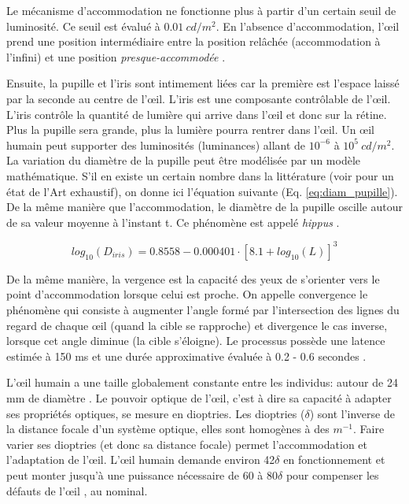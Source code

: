 	\par Le mécanisme d'accommodation ne fonctionne plus à partir d'un certain seuil de luminosité. Ce seuil est évalué à $0.01~cd/m^2$. En l'absence d'accommodation, l'œil prend une position intermédiaire entre la position relâchée (accommodation à l'infini) et une position \textit{presque-accommodée} \citep{gross_human_2008}.
	
	\par Ensuite, la pupille et l'iris sont intimement liées car la première est l'espace laissé par la seconde au centre de l'œil. L'iris est une composante contrôlable de l'œil. L'iris contrôle la quantité de lumière qui arrive dans l'œil et donc sur la rétine. Plus la pupille sera grande, plus la lumière pourra rentrer dans l'œil. Un œil humain peut supporter des luminosités (luminances) allant de $10^{-6}$ à $10^5~cd/m^2$. La variation du diamètre de la pupille peut être modélisée par un modèle mathématique. S'il en existe un certain nombre dans la littérature (voir \citep{watson_unified_2012} pour un état de l'Art exhaustif), on donne ici l'équation suivante (Eq. \ref{eq:diam_pupille}). De la même manière que l'accommodation, le diamètre de la pupille oscille autour de sa valeur moyenne à l'instant t. Ce phénomène est appelé \textit{hippus} \citep{gross_human_2008}.
	
	\begin{equation}
		log_{10}(D_{iris}) = 0.8558 - 0.000401 \cdot [8.1 + log_{10}(L)]^3
		\label{eq:diam_pupille}
	\end{equation}
	
	\par De la même manière, la vergence est la capacité des yeux de s'orienter vers le point d'accommodation lorsque celui est proche. On appelle convergence le phénomène qui consiste à augmenter l'angle formé par l'intersection des lignes du regard de chaque œil (quand la cible se rapproche) et divergence le cas inverse, lorsque cet angle diminue (la cible s'éloigne). Le processus possède une latence estimée à 150 ms et une durée approximative évaluée à 0.2 - 0.6 secondes \citep{devisme_optimisation_2004, gross_human_2008}.
	
	\par L'œil humain a une taille globalement constante entre les individus: autour de 24 mm de diamètre \citep{glassner_principles_1995}. Le pouvoir optique de l'œil, c'est à dire sa capacité à adapter ses propriétés optiques, se mesure en dioptries. Les dioptries ($\delta$) sont l'inverse de la distance focale d'un système optique, elles sont homogènes à des $m^{-1}$. Faire varier ses dioptries (et donc sa distance focale) permet l'accommodation et l'adaptation de l'œil. L'œil humain demande environ 42$\delta$ en fonctionnement et peut monter jusqu'à une puissance nécessaire de 60 à 80$\delta$ pour compenser les défauts de l'œil \citep{glassner_principles_1995}, au nominal.
	
